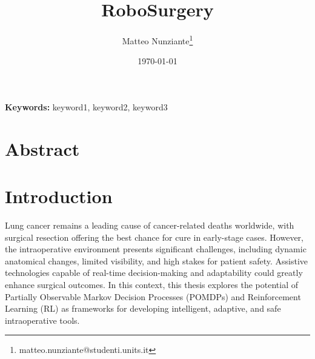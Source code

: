\documentclass[12pt,a4paper]{article}
\title{RoboSurgery}
\author{Matteo Nunziante\thanks{matteo.nunziante@studenti.units.it}}
\date{\today}
\begin{document}
\maketitle

\begin{abstract}

\end{abstract}

\textbf{Keywords:} keyword1, keyword2, keyword3
\newpage


\tableofcontents 
\newpage

\section{Abstract}



\newpage
\section{Introduction}
Lung cancer remains a leading cause of cancer-related deaths worldwide, with surgical 
resection offering the best chance for cure in early-stage cases. However, the 
intraoperative environment presents significant challenges, including dynamic 
anatomical changes, limited visibility, and high stakes for patient safety. Assistive 
technologies capable of real-time decision-making and adaptability could greatly 
enhance surgical outcomes. In this context, this thesis explores the potential of 
Partially Observable Markov Decision Processes (POMDPs) and Reinforcement Learning 
(RL) as frameworks for developing intelligent, adaptive, and safe intraoperative 
tools.

\end{document}
